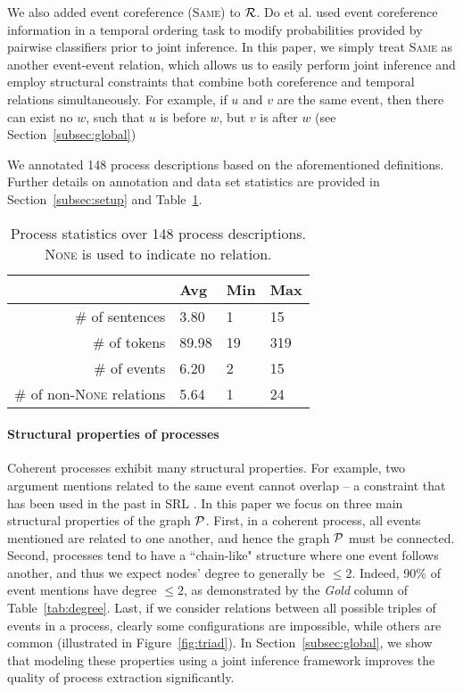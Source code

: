 We also added event coreference (\textsc{Same}) to $\mathcal{R}$. Do et al.  used event coreference information in a temporal ordering task to modify probabilities provided by pairwise classifiers prior to joint inference. In this paper, we simply treat \textsc{Same} as another event-event relation, which allows us to easily perform joint inference and employ structural constraints that combine both coreference and temporal relations simultaneously. For example, if $u$ and $v$ are the same event, then there can exist no $w$, such that $u$ is before $w$, but $v$ is after $w$ (see Section~\ref{subsec:global})

We annotated 148 process descriptions based on the aforementioned definitions. Further details on annotation and data set statistics are provided in Section~\ref{subsec:setup} and Table~\ref{tab:datastats}.

\begin{table}[t]
{\small
\hfill{}
\begin{tabular}{ r | l | l | l }
&\textbf{Avg}&\textbf{Min} & \textbf{Max}\\
\hline
\# of sentences            &     3.80       &    1        &   15 \\ 
\# of tokens            &     89.98        &   19        & 319  \\ 
\# of events                &   6.20         &       2   &  15  \\ 
\# of non-\textsc{None} relations          &     5.64       &      1        &  24 \\ 
\end{tabular}}
\hfill{}
\caption{Process statistics over 148 process descriptions. \textsc{None} is used to indicate no relation.}
\label{tab:datastats}
\end{table}

\paragraph{Structural properties of processes} 
Coherent processes exhibit many structural properties.
For example, two argument mentions related to the same event cannot overlap -- a constraint that has been used in the past in SRL \cite{Toutanova08}. In this paper we focus on three main structural properties of the graph $\mathcal{P}$. First, in a coherent process, all events mentioned are related to one another, and hence the graph $\mathcal{P}$ must be connected. Second, processes tend to have a ``chain-like" structure where one event follows another, and thus we expect nodes' degree to generally be $\leq 2$. Indeed, 90\% of event mentions have degree $\leq2$, as demonstrated by the \emph{Gold} column of Table~\ref{tab:degree}. Last, if we consider relations between all possible triples of events in a process, clearly some configurations are impossible, while others are common (illustrated in Figure~\ref{fig:triad}). In Section~\ref{subsec:global}, we show that modeling these properties using a joint inference framework improves the quality of process extraction significantly.

